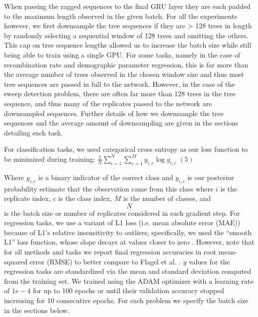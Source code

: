 When passing the ragged sequences to the final GRU layer they are each padded to the maximum length observed in the given batch. For all the experiments however, we first downsample the tree sequences if they are > 128 trees in length by randomly selecting a sequential window of 128 trees and omitting the others. This cap on tree sequence lengths allowed us to increase the batch size while still being able to train using a single GPU. For some tasks, namely in the case of recombination rate and demographic parameter regression, this is far more than the average number of trees observed in the chosen window size and thus most tree sequences are passed in full to the network. However, in the case of the sweep detection problem, there are often far more than 128 trees in the tree sequence, and thus many of the replicates passed to the network are downsampled sequences. Further details of how we downsample the tree sequences and the average amount of downsampling are given in the sections detailing each task. 
 
For classification tasks, we used categorical cross entropy as our loss function to be minimized during training: $\frac{1}{N}\sum_{i=1}^{N}\sum_{c=1}^{M}{y_{i,c}}\log{y_{i,c}} \;(5)$

Where $y_{i,c}$ is a binary indicator of the correct class and $y_{i,c}$ is our posterior probability estimate that the observation came from this class where $i$ is the replicate index, $c$ is the class index, $M$ is the number of classes, and $$N$$ is the batch size or number of replicates considered in each gradient step. For regression tasks, we use a variant of L1 loss (i.e. mean absolute error (MAE)) because of L1's relative insensitivity to outliers; specifically, we used the “smooth L1” loss function, whose slope decays at values closer to zero \cite{girshickFastRCNN2015}. However, note that for all methods and tasks we report final regression accuracies in root mean-squared error (RMSE) to better compare to Flagel et al. \cite{flagelUnreasonableEffectivenessConvolutional2019}. $y$ values for the regression tasks are standardized via the mean and standard deviation computed from the training set. We trained using the ADAM optimizer \cite{kingmaAdamMethodStochastic2017} with a learning rate of $1e-4$ for up to 100 epochs or until their validation accuracy stopped increasing for 10 consecutive epochs. For each problem we specify the batch size in the sections below.


